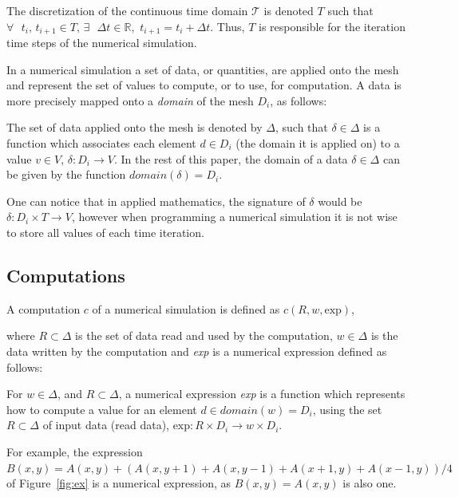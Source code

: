 \begin{mydef}
The discretization of the continuous time domain $\mathcal{T}$ is denoted $T$ such that $\forall\mbox{ }t_i\mbox{, }t_{i+1} \in T\mbox{, }\exists\mbox{ }\Delta t \in \mathbb{R}$\mbox{, }$t_{i+1} = t_i + \Delta t$. Thus, $T$ is responsible for the iteration time steps of the numerical simulation. 
\end{mydef}

In a numerical simulation a set of data, or quantities, are applied onto the mesh and represent the set of values to compute, or to use, for computation. A data is more precisely mapped onto a \emph{domain} of the mesh $D_i$, as follows:

\begin{mydef}
The set of data applied onto the mesh is denoted by $\Delta$, such that $\delta \in \Delta$ is a function which associates each element $d \in D_i$ (the domain it is applied on) to a value $v \in V$, $\delta : D_i \rightarrow V$. In the rest of this paper, the domain of a data $\delta \in \Delta$ can be given by the function $domain(\delta)=D_i$.
\end{mydef}
One can notice that in applied mathematics, the signature of $\delta$ would be $\delta : D_i \times T \rightarrow V$, however when programming a numerical simulation it is not wise to store all values of each time iteration.

\subsection{Computations}

\begin{mydef}
A computation $c$ of a numerical simulation is defined as $c(R,w,\text{exp})$,
\end{mydef}
where $R \subset \Delta$ is the set of data read and used by the computation, $w \in \Delta$ is the data written by the computation and \textit{exp} is a numerical expression defined as follows:

\begin{mydef}
For $w \in \Delta$, and $R \subset \Delta$, a numerical expression \textit{exp} is a function which represents how to compute a value for an element $d \in domain(w)=D_i$, using the set $R \subset \Delta$ of input data (read data), $\text{exp} : R \times D_i \rightarrow w \times D_i$.
\end{mydef}

For example, the expression $B(x,y) = A(x,y)+(A(x,y+1)+A(x,y-1)+A(x+1,y)+A(x-1,y))/4$ of Figure~\ref{fig:ex} is a numerical expression, as $B(x,y) = A(x,y)$ is also one.

